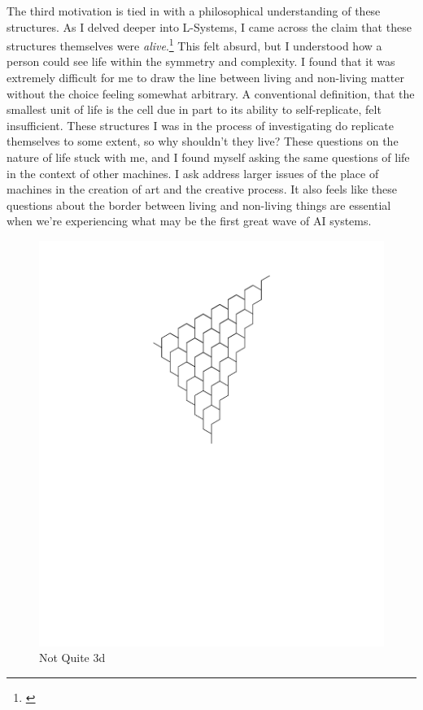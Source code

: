 \documentclass[12pt,twoside]{reedthesis}
\begin{document}
	The third motivation is tied in with a philosophical understanding of these structures. As I delved deeper into L-Systems, I came across the claim that these structures themselves were \textit{alive}.\footnote{\cite{theory2004}} This felt absurd, but I understood how a person could see life within the symmetry and complexity. I found that it was extremely difficult for me to draw the line between living and non-living matter without the choice feeling somewhat arbitrary. A conventional definition, that the smallest unit of life is the cell due in part to its ability to self-replicate, felt insufficient. These structures I was in the process of investigating do replicate themselves to some extent, so why shouldn't they live? These questions on the nature of life stuck with me, and I found myself asking the same questions of life in the context of other machines. I ask address larger issues of the place of machines in the creation of art and the creative process. It also feels like these questions about the border between living and non-living things are essential when we're experiencing what may be the first great wave of AI systems.

	\begin{figure}[h]
	\centering
	\includegraphics[clip=true, viewport=1in 6in 9in 11in, scale=0.4]{Images/ThePathWeWillFollow1}
	\caption[Not Quite 3d]{Not Quite 3d\footnotemark}
	\label {Motivations3}
	\end{figure}
\end{document}
